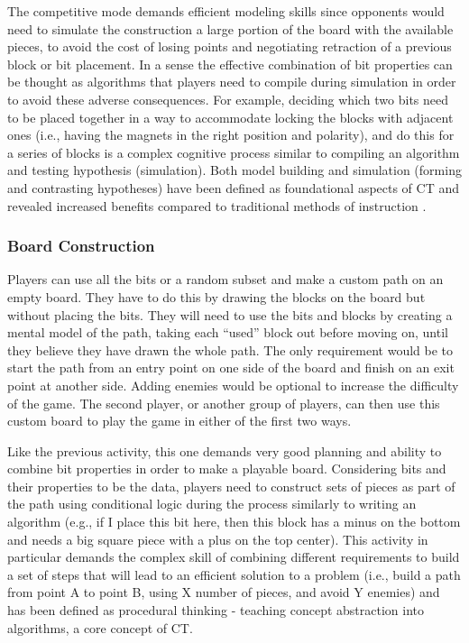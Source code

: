 \documentclass{acm_proc_article-sp}
\begin{document}
The competitive mode demands efficient modeling skills since opponents would need to simulate the construction a large portion of the board with the available pieces, to avoid the cost of losing points and negotiating retraction of a previous block or bit placement. In a sense the effective combination of bit properties can be thought as algorithms that players need to compile during simulation in order to avoid these adverse consequences. For example, deciding which two bits need to be placed together in a way to accommodate locking the blocks with adjacent ones (i.e., having the magnets in the right position and polarity), and do this for a series of blocks is a complex cognitive process similar to compiling an algorithm and testing hypothesis (simulation). Both model building and simulation (forming and contrasting hypotheses) have been defined as foundational aspects of CT and revealed increased benefits compared to traditional methods of instruction \cite{wilensky2006thinking}.

\subsubsection{Board Construction}
Players can use all the bits or a random subset and make a custom path on an empty board. They have to do this by drawing the blocks on the board but without placing the bits. They will need to use the bits and blocks by creating a mental model of the path, taking each ``used'' block out before moving on, until they believe they have drawn the whole path. The only requirement would be to start the path from an entry point on one side of the board and finish on an exit point at another side. Adding enemies would be optional to increase the difficulty of the game. The second player, or another group of players, can then use this custom board to play the game in either of the first two ways.

Like the previous activity, this one demands very good planning and ability to combine bit properties in order to make a playable board. Considering bits and their properties to be the data, players need to construct sets of pieces as part of the path using conditional logic during the process similarly to writing an algorithm (e.g., if I place this bit here, then this block has a minus on the bottom and needs a big square piece with a plus on the top center). This activity in particular demands the complex skill of combining different requirements to build a set of steps that will lead to an efficient solution to a problem (i.e., build a path from point A to point B, using X number of pieces, and avoid Y enemies) and has been defined as procedural thinking - teaching concept abstraction into algorithms\cite{papert1980mindstorms}, a core concept of CT\cite{national2010report}.
\end{document}
